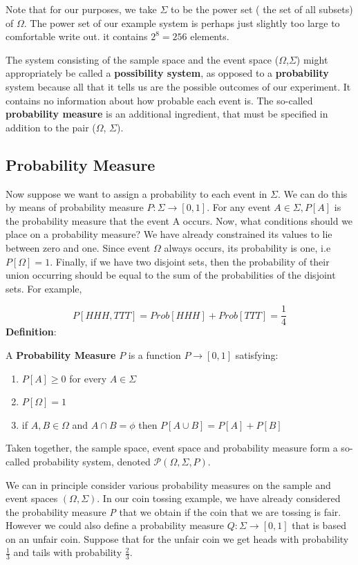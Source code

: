 \documentclass[12pt]{article}
\begin{document}
Note that for our purposes, we take $\Sigma$ to be the power set ( the set of all subsets) of $\Omega$. The power set of our example system is perhaps just slightly too large to comfortable write out. it contains $2^{8}=256$ elements.

The system consisting of the sample space and the event space  ($\Omega$,$\Sigma$) might appropriately be called a \textbf{possibility system}, as opposed to a \textbf{probability} system because all that it tells us are the possible outcomes of our experiment. It contains no information about how probable each event is. The so-called \textbf{probability measure} is an additional ingredient, that must be specified in addition to the pair ($\Omega$, $\Sigma$).
\subsection{Probability Measure}
Now suppose we want to assign a probability to each event in $\Sigma$. We can do this by means of probability measure $P: \Sigma \longrightarrow [0,1]$. For any event $A\in\Sigma,P[A]$ is the probability measure that the event A occurs. Now, what conditions should we place on a probability measure? We have already constrained its values to lie between zero and one. Since event $\Omega$ always occurs, its probability is one, i.e $P[\Omega]=1$. Finally, if we have two disjoint sets, then the probability of their union occurring should be equal to the sum of the probabilities of the disjoint sets. For example,

\begin{equation}
P[{HHH,TTT}]=Prob [{HHH}]+ Prob[{TTT}]=\frac{1}{4}
\end{equation}
\textbf{Definition}:

A \textbf{Probability Measure} $P$ is a function $P\longrightarrow[0,1]$ satisfying:

\begin{enumerate}
	\item $P[A] \geq 0$ for every $A \in \Sigma$
	\item $P[\Omega]=1$
	\item if $A, B \in \Omega$ and $A \cap B=\phi$ then $P[A \cup B]=P[A]+P[B]$
	
\end{enumerate}

Taken together, the sample space, event space and probability measure
form a so-called probability system, denoted  $\mathcal{P}(\Omega, \Sigma, P)$.

We can in principle consider various probability measures on the sample and event spaces $(\Omega, \Sigma)$.
In our coin tossing example, we have already considered the probability measure \textit{P} that we obtain if the coin that we are tossing is fair. However we could also define a probability measure $Q: \Sigma \longrightarrow[0,1]$ that is based on an unfair coin. Suppose that for the unfair coin we get heads with probability $\frac{1}{3}$ and tails with probability $\frac{2}{3}$.
\end{document}
